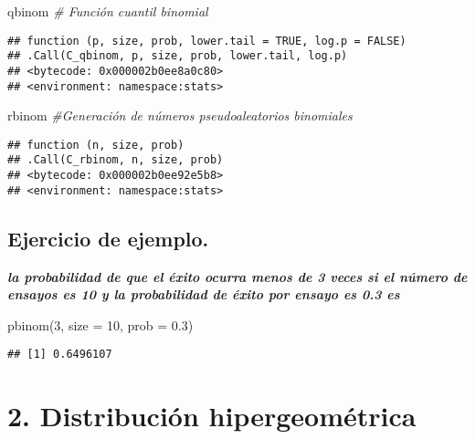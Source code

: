 \documentclass[
]{article}
\newenvironment{Shaded}{\begin{snugshade}}{\end{snugshade}}
\newcommand{\AttributeTok}[1]{\textcolor[rgb]{0.77,0.63,0.00}{#1}}
\newcommand{\CommentTok}[1]{\textcolor[rgb]{0.56,0.35,0.01}{\textit{#1}}}
\newcommand{\DecValTok}[1]{\textcolor[rgb]{0.00,0.00,0.81}{#1}}
\newcommand{\FloatTok}[1]{\textcolor[rgb]{0.00,0.00,0.81}{#1}}
\newcommand{\FunctionTok}[1]{\textcolor[rgb]{0.00,0.00,0.00}{#1}}
\newcommand{\NormalTok}[1]{#1}
\begin{document}
\begin{Shaded}
\begin{Highlighting}[]
\NormalTok{qbinom }\CommentTok{\#    Función cuantil binomial}
\end{Highlighting}
\end{Shaded}

\begin{verbatim}
## function (p, size, prob, lower.tail = TRUE, log.p = FALSE) 
## .Call(C_qbinom, p, size, prob, lower.tail, log.p)
## <bytecode: 0x000002b0ee8a0c80>
## <environment: namespace:stats>
\end{verbatim}

\begin{Shaded}
\begin{Highlighting}[]
\NormalTok{rbinom  }\CommentTok{\#Generación de números pseudoaleatorios binomiales}
\end{Highlighting}
\end{Shaded}

\begin{verbatim}
## function (n, size, prob) 
## .Call(C_rbinom, n, size, prob)
## <bytecode: 0x000002b0ee92e5b8>
## <environment: namespace:stats>
\end{verbatim}

\hypertarget{ejercicio-de-ejemplo.}{%
\subsection{Ejercicio de ejemplo.}\label{ejercicio-de-ejemplo.}}

\textbf{\emph{la probabilidad de que el éxito ocurra menos de 3 veces si
el número de ensayos es 10 y la probabilidad de éxito por ensayo es 0.3
es}}

\begin{Shaded}
\begin{Highlighting}[]
\FunctionTok{pbinom}\NormalTok{(}\DecValTok{3}\NormalTok{, }\AttributeTok{size =} \DecValTok{10}\NormalTok{, }\AttributeTok{prob =} \FloatTok{0.3}\NormalTok{)}
\end{Highlighting}
\end{Shaded}

\begin{verbatim}
## [1] 0.6496107
\end{verbatim}

\hypertarget{distribuciuxf3n-hipergeomuxe9trica}{%
\section{2. Distribución
hipergeométrica}\label{distribuciuxf3n-hipergeomuxe9trica}}
\end{document}
